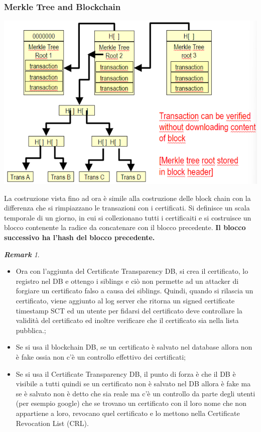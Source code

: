 \documentclass{book}
\theoremstyle{remark}
\newtheorem*{remark}{\textbf{Remark}}
\begin{document}
\subsubsection{Merkle Tree and Blockchain}
\begin{center}
	\includegraphics[scale=0.6]{2021-12-09-16-28-26.png}
\end{center}
La costruzione vista fino ad ora è simile alla costruzione delle block chain con la differenza che si rimpiazzano le transazioni con i certificati\@. Si definisce un scala temporale di un giorno, in cui si collezionano tutti i certificaiti e si costruisce un blocco contenente la radice da concatenare con il blocco precedente\@. \textbf{Il blocco successivo ha l'hash del blocco precedente\@.}
\begin{remark}
	\begin{itemize}
		\item Ora con l'aggiunta del Certificate Transparency DB, si crea il certificato, lo registro nel DB e ottengo i siblings e ciò non permette ad un attacker di forgiare un certificato falso a causa dei siblings\@. Quindi, quando si rilascia un certificato, viene aggiunto al log server che ritorna un signed certificate timestamp SCT ed un utente per fidarsi del certificato deve controllare la validità del certificato ed inoltre verificare che il certificato sia nella lista pubblica\@.;\@
		\item Se si usa il blockchain DB, se un certificato è salvato nel database allora non è fake ossia non c'è un controllo effettivo dei certificati;\@
		\item Se si usa il Certificate Transparency DB, il punto di forza è che il DB è visibile a tutti quindi se un certificato non è salvato nel DB allora è fake ma se è salvato non è detto che sia reale ma c'è un controllo da parte degli utenti (per esempio google) che se trovano un certificato con il loro nome che non appartiene a loro, revocano quel certificato e lo mettono nella Certificate Revocation List (CRL)\@.
	\end{itemize}
\end{remark}
\end{document}
